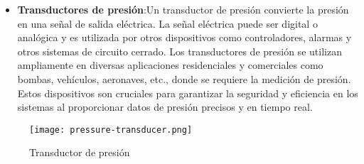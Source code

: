 \begin{itemize}
	\item \textbf{Transductores de presión}:Un transductor de presión convierte la presión en una señal de salida eléctrica. La señal eléctrica puede ser digital o analógica y es utilizada por otros dispositivos como controladores, alarmas y otros sistemas de circuito cerrado. Los transductores de presión se utilizan ampliamente en diversas aplicaciones residenciales y comerciales como bombas, vehículos, aeronaves, etc., donde se requiere la medición de presión. Estos dispositivos son cruciales para garantizar la seguridad y eficiencia en los sistemas al proporcionar datos de presión precisos y en tiempo real.
\end{itemize}
\begin{figure}[H]
	\centering
	\texttt{[image: pressure-transducer.png]}
	\caption{Transductor de presión}
\end{figure}

